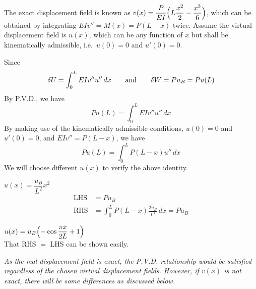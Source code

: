 \begin{example}[P.V.D.]
\leavevmode
\begin{fig}
  
\end{fig}
The exact displacement field is known as $v(x) = \dfrac{P}{EI}\Bigl(L\dfrac{x^2}{2} - \dfrac{x^3}{6}\Bigr)$, which can be obtained by integrating $EIv'' = M(x) = P(L-x)$ twice. Assume the virtual displacement field is $u(x)$, which can be any function of $x$ but shall be kinematically admissible, i.e.\ $u(0) = 0$ and $u'(0) = 0$.

Since
\begin{equation*}
  \delta U = \int_0^L EIv''u''\,dx\qquad\text{and}\qquad \delta W = Pu_B = Pu(L)
\end{equation*}
By P.V.D., we have
\begin{equation*}
  Pu(L) = \int_0^L EIv''u''\,dx
\end{equation*}
By making use of the kinematically admissible conditions, $u(0) = 0$ and $u'(0) = 0$, and $EIv'' = P(L-x)$, we have
\begin{equation*}
  Pu(L) = \int_0^L P(L-x)u''\,dx
\end{equation*}
We will choose different $u(x)$ to verify the above identity.
\begin{description}[leftmargin=2em]
  \item[Case 1:] $u(x) = \dfrac{u_B}{L^2}x^2$
    \begin{align*}
      \text{LHS} &= Pu_B\\
      \text{RHS} &= \int_0^L P(L-x)\frac{2u_B}{L^2}\,dx = Pu_B
    \end{align*}
  \item[Case 2:] $u(x) = u_B\Bigl(-\cos\dfrac{\pi x}{2L}+1\Bigr)$\\
    That RHS $=$ LHS can be shown easily.
\end{description}
\emph{As the real displacement field is exact, the P.V.D. relationship would be satisfied regardless of the chosen virtual displacement fields. However, if $v(x)$ is not exact, there will be some differences as discussed below.}


\end{example}
